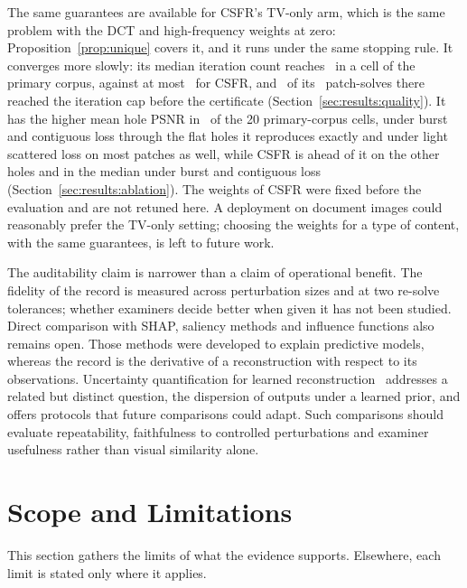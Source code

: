 \documentclass[final,3p]{elsarticle}
\begin{document}
The same guarantees are available for CSFR's TV-only arm, which is the same problem with the DCT and high-frequency weights at zero: Proposition~\ref{prop:unique} covers it, and it runs under the same stopping rule. It converges more slowly: its median iteration count reaches \convTvItersMax\ in a cell of the primary corpus, against at most \convGovItersMax\ for CSFR, and \convArmNCapped\ of its \convTvNSolves\ patch-solves there reached the iteration cap before the certificate (Section~\ref{sec:results:quality}). It has the higher mean hole PSNR in \ablTvNBehind\ of the 20 primary-corpus cells, under burst and contiguous loss through the flat holes it reproduces exactly and under light scattered loss on most patches as well, while CSFR is ahead of it on the other holes and in the median under burst and contiguous loss (Section~\ref{sec:results:ablation}). The weights of CSFR were fixed before the evaluation and are not retuned here. A deployment on document images could reasonably prefer the TV-only setting; choosing the weights for a type of content, with the same guarantees, is left to future work.

The auditability claim is narrower than a claim of operational benefit. The fidelity of the record is measured across perturbation sizes and at two re-solve tolerances; whether examiners decide better when given it has not been studied. Direct comparison with SHAP, saliency methods and influence functions also remains open. Those methods were developed to explain predictive models, whereas the record is the derivative of a reconstruction with respect to its observations. Uncertainty quantification for learned reconstruction~\cite{edupuganti2021uncertainty,narnhofer2022bayesian,ekmekci2022uncertainty} addresses a related but distinct question, the dispersion of outputs under a learned prior, and offers protocols that future comparisons could adapt. Such comparisons should evaluate repeatability, faithfulness to controlled perturbations and examiner usefulness rather than visual similarity alone.

\section{Scope and Limitations}
\label{sec:limits}

This section gathers the limits of what the evidence supports. Elsewhere, each limit is stated only where it applies.
\end{document}
